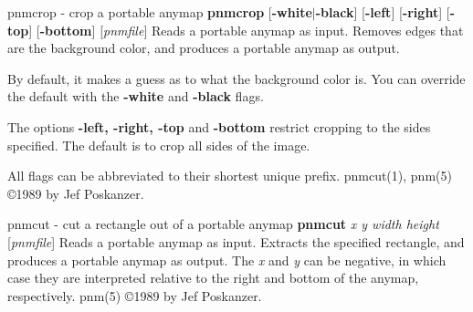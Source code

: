\newpage
%

pnmcrop - crop a portable anymap
{\bf pnmcrop}
{\rm [}{\bf -white}{\rm $|$}{\bf -black}{\rm ]}
{\rm [}{\bf -left}{\rm ]}
{\rm [}{\bf -right}{\rm ]}
{\rm [}{\bf -top}{\rm ]}
{\rm [}{\bf -bottom}{\rm ]}
{\rm [}{\it pnmfile}{\rm ]}
Reads a portable anymap as input.
Removes edges that are the background color,
and produces a portable anymap as output.
\par
By default, it makes a guess as to what the background color is.
You can override the default with the
{\bf -white}
and
{\bf -black}
flags.
\par
The options
{\bf -left, -right, -top}
and
{\bf -bottom}
restrict cropping to the sides specified. The default is to crop all sides of
the image.
\par
All flags can be abbreviated to their shortest unique prefix.
pnmcut(1), pnm(5)
\copyright 1989 by Jef Poskanzer.
%
 
%

\newpage
%

pnmcut - cut a rectangle out of a portable anymap
{\bf pnmcut}
{\it x y width height}
{\rm [}{\it pnmfile}{\rm ]}
Reads a portable anymap as input.
Extracts the specified rectangle,
and produces a portable anymap as output.
The
{\it x}
and
{\it y}
can be negative, in which case they are interpreted
relative to the right and bottom of the anymap, respectively.
pnm(5)
\copyright 1989 by Jef Poskanzer.
%
 
